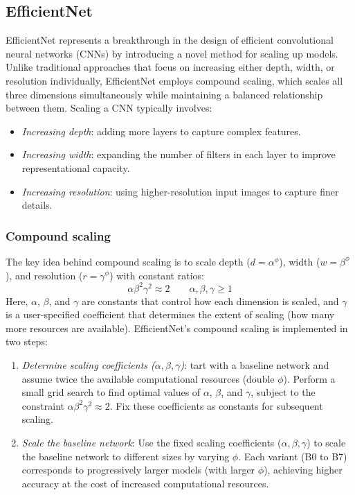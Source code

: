 \subsection{EfficientNet}
EfficientNet represents a breakthrough in the design of efficient convolutional neural networks (CNNs) by introducing a novel method for scaling up models. 
Unlike traditional approaches that focus on increasing either depth, width, or resolution individually, EfficientNet employs compound scaling, which scales all three dimensions simultaneously while maintaining a balanced relationship between them.
Scaling a CNN typically involves:
\begin{itemize}
    \item \textit{Increasing depth}: adding more layers to capture complex features.
    \item \textit{Increasing width}: expanding the number of filters in each layer to improve representational capacity.
    \item \textit{Increasing resolution}: using higher-resolution input images to capture finer details.
\end{itemize}

\subsubsection{Compound scaling}
The key idea behind compound scaling is to scale depth ($d=\alpha^\phi$), width ($w=\beta^\phi$), and resolution ($r=\gamma^\phi$) with constant ratios: 
\[\alpha\beta^2\gamma^2\approx 2 \qquad \alpha,\beta,\gamma \geq 1\]
Here, $\alpha$, $\beta$, and $\gamma$ are constants that control how each dimension is scaled, and $\gamma$ is a user-specified coefficient that determines the extent of scaling (how many more resources are available). 
EfficientNet's compound scaling is implemented in two steps:
\begin{enumerate}
    \item \textit{Determine scaling coefficients ($\alpha, \beta, \gamma$)}: tart with a baseline network and assume twice the available computational resources (double $\phi$).
        Perform a small grid search to find optimal values of $\alpha$, $\beta$, and $\gamma$,  subject to the constraint $\alpha\beta^2\gamma^2\approx 2$.
        Fix these coefficients as constants for subsequent scaling.
    \item \textit{Scale the baseline network}: Use the fixed scaling coefficients ($\alpha, \beta, \gamma$) to scale the baseline network to different sizes by varying $\phi$.
        Each variant (B0 to B7) corresponds to progressively larger models (with larger $\phi$), achieving higher accuracy at the cost of increased computational resources.
\end{enumerate}